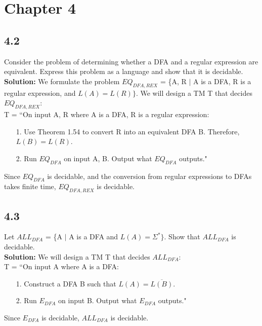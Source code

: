 \section{Chapter 4}
\subsection*{4.2} Consider the problem of determining whether a DFA and a regular expression are equivalent. Express this problem as a language and show that it is decidable.
\\
\textbf{Solution:} We formulate the problem $EQ_{DFA,REX}$ = \{\textlangle{}A, R\textrangle{} $|$ A is a DFA, R is a regular expression, and $L(A) = L(R)\}$. We will design a TM T that decides $EQ_{DFA,REX}$:
\\
T = ``On input \textlangle{}A, R\textrangle{} where A is a DFA, R is a regular expression:
\begin{enumerate}
\itemsep0em
\item[1.]Use Theorem 1.54 to convert R into an equivalent DFA B. Therefore, $L(B) = L(R)$.
\item[2.]Run $EQ_{DFA}$ on input \textlangle{}A, B\textrangle{}. Output what $EQ_{DFA}$ outputs."
\end{enumerate}
Since $EQ_{DFA}$ is decidable, and the conversion from regular expressions to DFAs takes finite time, $EQ_{DFA,REX}$ is decidable.

\subsection*{4.3} Let $ALL_{DFA}$ = \{\textlangle{}A\textrangle{} $|$ A is a DFA and $L(A) = \Sigma^*\}$. Show that $ALL_{DFA}$ is decidable.
\\
\textbf{Solution:} We will design a TM T that decides $ALL_{DFA}$:
\\
T = ``On input \textlangle{}A\textrangle{} where A is a DFA:
\begin{enumerate}
\itemsep0em
\item[1.]Construct a DFA B such that $L(A) = \overline{L(B)}$.
\item[2.]Run $E_{DFA}$ on input \textlangle{}B\textrangle{}. Output what $E_{DFA}$ outputs."
\end{enumerate}
Since $E_{DFA}$ is decidable, $ALL_{DFA}$ is decidable.

